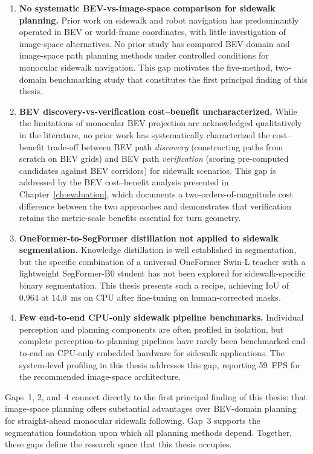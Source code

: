\documentclass[12pt,letterpaper,oneside]{report}
\begin{document}
\begin{enumerate}
  \item \textbf{No systematic BEV-vs-image-space comparison for sidewalk planning.} Prior work on sidewalk and robot navigation has predominantly operated in BEV or world-frame coordinates, with little investigation of image-space alternatives. No prior study has compared BEV-domain and image-space path planning methods under controlled conditions for monocular sidewalk navigation. This gap motivates the five-method, two-domain benchmarking study that constitutes the first principal finding of this thesis.

  \item \textbf{BEV discovery-vs-verification cost--benefit uncharacterized.} While the limitations of monocular BEV projection are acknowledged qualitatively in the literature, no prior work has systematically characterized the cost--benefit trade-off between BEV path \emph{discovery} (constructing paths from scratch on BEV grids) and BEV path \emph{verification} (scoring pre-computed candidates against BEV corridors) for sidewalk scenarios. This gap is addressed by the BEV cost--benefit analysis presented in Chapter~\ref{ch:evaluation}, which documents a two-orders-of-magnitude cost difference between the two approaches and demonstrates that verification retains the metric-scale benefits essential for turn geometry.

  \item \textbf{OneFormer-to-SegFormer distillation not applied to sidewalk segmentation.} Knowledge distillation is well established in segmentation, but the specific combination of a universal OneFormer Swin-L teacher with a lightweight SegFormer-B0 student has not been explored for sidewalk-specific binary segmentation. This thesis presents such a recipe, achieving IoU of 0.964 at 14.0~ms on CPU after fine-tuning on human-corrected masks.

  \item \textbf{Few end-to-end CPU-only sidewalk pipeline benchmarks.} Individual perception and planning components are often profiled in isolation, but complete perception-to-planning pipelines have rarely been benchmarked end-to-end on CPU-only embedded hardware for sidewalk applications. The system-level profiling in this thesis addresses this gap, reporting 59~FPS for the recommended image-space architecture.
\end{enumerate}

Gaps~1, 2, and~4 connect directly to the first principal finding of this thesis: that image-space planning offers substantial advantages over BEV-domain planning for straight-ahead monocular sidewalk following. Gap~3 supports the segmentation foundation upon which all planning methods depend. Together, these gaps define the research space that this thesis occupies.
\end{document}
